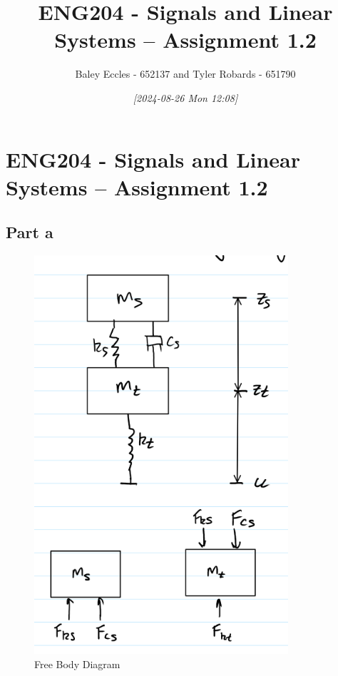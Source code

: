 \documentclass[11pt]{article}
\author{Baley Eccles - 652137 and Tyler Robards - 651790}
\date{\textit{{[}2024-08-26 Mon 12:08]}}
\title{ENG204 - Signals and Linear Systems – Assignment 1.2}
\begin{document}
\maketitle
\tableofcontents

\section{ENG204 - Signals and Linear Systems – Assignment 1.2}
\label{sec:org831f92d}
\subsection{Part a}
\label{sec:org72d9136}
\begin{figure}[h]
    \centering
    \includegraphics[width=.9\linewidth]{ENG204-FBD.png}
    \caption{Free Body Diagram}
    \label{fig:FBD}
\end{figure}
\end{document}
